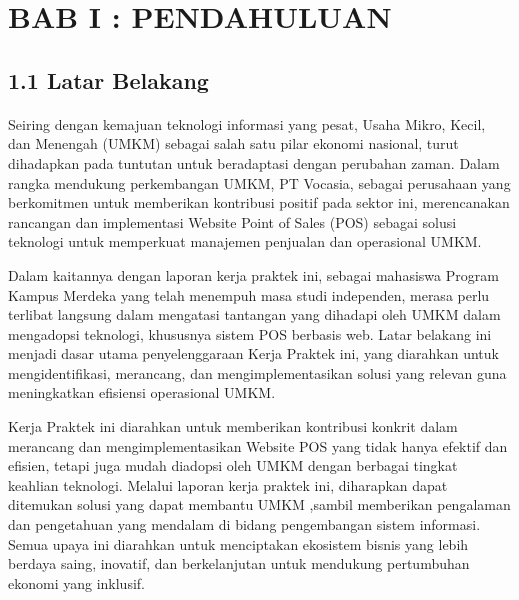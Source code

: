 \newpage

\section*{
  \small
  \centering
  BAB I : PENDAHULUAN
 }

\vspace{1.5pt}

\subsection*{
	\small
	1.1 Latar Belakang
}

\paragraph{}
Seiring dengan kemajuan teknologi informasi yang pesat, Usaha Mikro,
Kecil, dan Menengah (UMKM) sebagai salah satu pilar ekonomi nasional, turut
dihadapkan pada tuntutan untuk beradaptasi dengan perubahan zaman. Dalam
rangka mendukung perkembangan UMKM, PT Vocasia, sebagai perusahaan yang
berkomitmen untuk memberikan kontribusi positif pada sektor ini, merencanakan
rancangan dan implementasi Website Point of Sales (POS) sebagai solusi teknologi
untuk memperkuat manajemen penjualan dan operasional UMKM.

Dalam kaitannya dengan laporan kerja praktek ini, sebagai mahasiswa
Program Kampus Merdeka yang telah menempuh masa studi independen, merasa
perlu terlibat langsung dalam mengatasi tantangan yang dihadapi oleh UMKM
dalam mengadopsi teknologi, khususnya sistem POS berbasis web. Latar belakang
ini menjadi dasar utama penyelenggaraan Kerja Praktek ini, yang diarahkan untuk
mengidentifikasi, merancang, dan mengimplementasikan solusi yang relevan guna
meningkatkan efisiensi operasional UMKM.

Kerja Praktek ini diarahkan untuk memberikan kontribusi konkrit dalam
merancang dan mengimplementasikan Website POS yang tidak hanya efektif dan
efisien, tetapi juga mudah diadopsi oleh UMKM dengan berbagai tingkat keahlian
teknologi. Melalui laporan kerja praktek ini, diharapkan dapat ditemukan solusi
yang dapat membantu UMKM ,sambil memberikan pengalaman dan pengetahuan
yang mendalam di bidang pengembangan sistem informasi. Semua upaya ini
diarahkan untuk menciptakan ekosistem bisnis yang lebih berdaya saing, inovatif,
dan berkelanjutan untuk mendukung pertumbuhan ekonomi yang inklusif.

